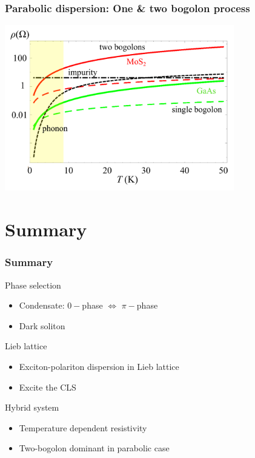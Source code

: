 \documentclass[9pt]{beamer}
\begin{document}
\begin{frame}[t]
\frametitle{Parabolic dispersion: One \& two bogolon process}
\begin{center}
\includegraphics[width=0.75\textwidth]{./fig/ch6_5.pdf}
\end{center}
\end{frame}

\section{Summary}

\begin{frame}
\frametitle{Summary}
\begin{center}
\begin{block}{Phase selection}
\begin{itemize}
\item Condensate: $0-$phase $\Leftrightarrow$ $\pi-$phase
\item Dark soliton
\end{itemize}
\end{block}
%
\begin{block}{Lieb lattice}
\begin{itemize}
\item Exciton-polariton dispersion in Lieb lattice
\item Excite the CLS
\end{itemize}
\end{block}
%
\begin{block}{Hybrid system}
\begin{itemize}
\item Temperature dependent resistivity
\item Two-bogolon dominant in parabolic case
\end{itemize}
\end{block}
\end{center}
\end{frame}
\end{document}

